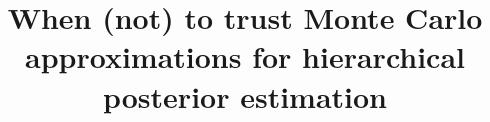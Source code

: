 \documentclass[%
 reprint,
 amsmath,amssymb,
 aps,nofootinbib,nobibnotes,onecolumn,prd
]{revtex4-2}
\begin{document}
\setcounter{page}{1}


\title{When (not) to trust Monte Carlo approximations for hierarchical posterior estimation}




\newcommand{\expec}[1]{\left\langle#1\right\rangle}  %
\newcommand{\drm}{{\rm d}}
\newcommand{\irm}{{\rm i}}
\newcommand{\nn}{\nonumber}
\newcommand{\beq}{\begin{equation}}
\newcommand{\eeq}{\end{equation}}
\newcommand{\bdm}{\begin{displaymath}}
\newcommand{\edm}{\end{displaymath}}
\newcommand{\T}[1]{\tilde{#1}}
\newcommand{\wT}[1]{\widetilde{#1}}
\newcommand{\Cdot}{\!\cdot\!}
\newcommand{\SNR}{\textnormal{SNR}}
\newcommand{\pvtwo}{\texttt{IMRPhenomPv2}}
\newcommand{\xphm}{\texttt{IMRPhenomXPHM}}
\newcommand{\pastro}{p_{\rm astro}}
\newcommand{\pastroi}{p_{{\rm astro},i}}
\newcommand{\pastroyj}{p_{{\rm astro}, \gamma(j)}}
\newcommand{\pastroyzj}{p_{{\rm astro}, \gamma_0(j)}}
\newcommand{\mcdet}{\mathcal{M}_{\rm c,det}}
\newcommand{\chieff}{\chi_{\rm eff}}
\newcommand{\dynesty}{\textsc{dynesty}\xspace}
\newcommand{\etabar}{\overline{\eta}}
\newcommand{\muhat}{\hat{\mu}}
\newcommand{\expectlarge}[1]{\left\langle #1 \right\rangle}
\newcommand{\variancelarge}[1]{\mathbb{V}\left[#1\right]}
\newcommand{\expect}[1]{\langle #1\rangle}
\newcommand{\variance}[1]{\mathbb{V}[#1]}
\newcommand{\logsumexp}[3]{{\rm LSE}_{#2}^{#3}\left(#1\right)}
\newcommand{\jh}[1]{{\textcolor{magenta}{\texttt{JH: #1}}}}
\newcommand{\est}[1]{\hat{\mathfrak{E}}\left[ #1 \right]}
\newcommand{\Nobs}{N_{\rm obs}}
\newcommand{\Nexp}{N_{\rm exp}}
\newcommand{\Neff}{N_{\rm eff}}
\newcommand{\dataset}{\{d_i\}_{i=1}^{\Nobs}}
\newcommand{\Ninj}{N_{\rm inj}}
\newcommand{\Nfound}{N_{\rm found}}
\newcommand{\Nsamp}{N_{\rm samp}}
\newcommand{\NPE}{N_{\rm PE}}
\newcommand{\thresh}{\rho_{\rm thr}}
\newcommand{\fixme}[1]{\textcolor{red}{FIXME: #1}}
\newcommand{\innerp}[1]{\left\langle#1\right\rangle}
\newcommand{\ECMGF}{{\rm ECMGF}}
\newcommand{\EMGF}{{\rm EMGF}}
\newcommand{\KLD}{{\rm KL}}

\newcommand{\GW}{\ac{GW}\xspace}
\newcommand{\GWs}{\acp{GW}\xspace}
\end{document}
